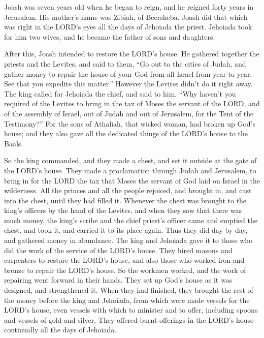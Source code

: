 \mychapter{} \myverse*{}Joash was seven years old when he began to reign, and he reigned
forty years in Jerusalem. His mother’s name was Zibiah, of Beersheba.
\myverse{}Joash did that which was right in the LORD’s eyes all the days of Jehoiada
the priest.
\myverse{}Jehoiada took for him two wives, and he became the father of sons and daughters.

\myverse{}After this, Joash intended to restore the LORD’s house.
\myverse{}He gathered together the priests and the Levites, and said to them, “Go out
to the cities of Judah, and gather money to repair the house of your God from all Israel from year to
year. See that you expedite this matter.” However the Levites didn’t do it right away.
\myverse{}The king called for Jehoiada the chief, and said to him, “Why haven’t you required
of the Levites to bring in the tax of Moses the servant of the LORD, and of the assembly of Israel, out
of Judah and out of Jerusalem, for the Tent of the Testimony?”
\myverse{}For the sons of Athaliah, that wicked woman, had broken up God’s house; and
they also gave all the dedicated things of the LORD’s house to the Baals.

\myverse{}So the king commanded, and they made a chest, and set it outside
at the gate of the LORD’s house.
\myverse{}They made a proclamation through Judah and Jerusalem, to bring in for the LORD
the tax that Moses the servant of God laid on Israel in the wilderness.
\myverse{}All the princes and all the people rejoiced, and brought in, and cast into
the chest, until they had filled it.
\myverse{}Whenever the chest was brought to the king’s officers by the hand of the
Levites, and when they saw that there was much money, the king’s scribe and the chief priest’s officer
came and emptied the chest, and took it, and carried it to its place again. Thus they did day by day,
and gathered money in abundance.
\myverse{}The king and Jehoiada gave it to those who did the work of the service of
the LORD’s house. They hired masons and carpenters to restore the LORD’s house, and also those who worked
iron and bronze to repair the LORD’s house.
\myverse{}So the workmen worked, and the work of repairing went forward in their hands.
They set up God’s house as it was designed, and strengthened it.
\myverse{}When they had finished, they brought the rest of the money before the king
and Jehoiada, from which were made vessels for the LORD’s house, even vessels with which to minister and
to offer, including spoons and vessels of gold and silver. They offered burnt offerings in the LORD’s
house continually all the days of Jehoiada.

